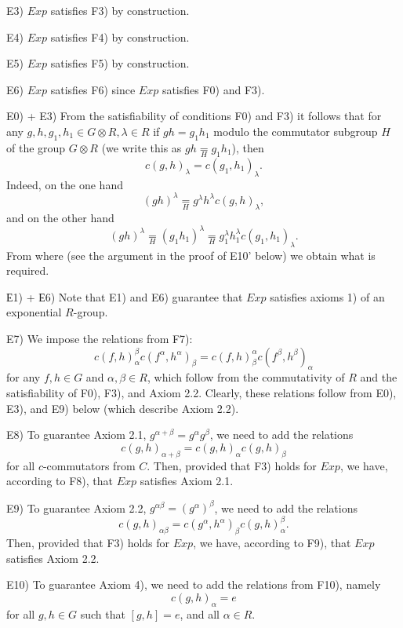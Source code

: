 \documentclass[11pt]{article}
\theoremstyle{definition}
\begin{document}
\medskip
\noindent
E3) $Exp$ satisfies F3) by construction.


\medskip
\noindent
E4) $Exp$ satisfies F4) by construction.


\medskip
\noindent
E5) $Exp$ satisfies F5) by construction.

\medskip
\noindent
E6) $Exp$ satisfies F6) since $Exp$ satisfies F0) and F3).

\medskip
\noindent
E0) + E3)  From the satisfiability of conditions F0) and F3) it follows that for any $g, h, g_1, h_1 \in G\otimes R, \lambda \in R$ if $gh = g_1h_1$ modulo the commutator subgroup $H$ of the group $G\otimes R$ (we write this as $gh \underset{H}{=} g_1h_1$), then
$$
c(g,h)_\lambda =c(g_1,h_1)_\lambda.
$$
Indeed, on the one hand
$$
(gh)^\lambda \underset{H}{=} g^\lambda h^\lambda c(g,h)_\lambda,
$$
and on the other hand
$$
(gh)^\lambda \underset{H}{=} (g_1h_1)^\lambda \underset{H}{=} g_1^\lambda h_1^\lambda c(g_1,h_1)_\lambda.
$$
From where (see the argument in the proof of E10' below) we obtain what is required.  

\medskip
\noindent
Е1) + Е6) Note that E1) and E6) guarantee that $Exp$ satisfies axioms 1) of an exponential $R$-group.


\medskip
\noindent
E7) We impose the relations from F7): 
$$
c(f,h)_{\alpha}^{\beta}c(f^{\alpha},h^{\alpha})_{\beta}
    =c(f,h)_{\beta}^{\alpha}c(f^{\beta},h^{\beta})_{\alpha}
$$
for any $f,h \in G$ and $\alpha,\beta\in R$, which follow from the commutativity of $R$ and the satisfiability of F0), F3), and Axiom 2.2. Clearly, these relations follow from E0), E3), and E9) below (which describe Axiom 2.2). 

\medskip
\noindent
E8) To guarantee Axiom 2.1, $g^{\alpha+\beta} = g^{\alpha}g^{\beta}$, we need to add the relations
$$
 c(g,h)_{\alpha +\beta} = c(g,h)_{\alpha}c(g,h)_{\beta}
$$
for all $c$-commutators from $C$. Then, provided that F3) holds for $Exp$, we have, according to F8), that $Exp$ satisfies Axiom 2.1.

\medskip
\noindent
E9) To guarantee Axiom 2.2, $g^{\alpha \beta} = (g^{\alpha})^{\beta}$, we need to add the relations 
 $$
 c(g,h)_{\alpha\beta} = c(g^{\alpha},h^{\alpha})_\beta  c(g,h)_{\alpha}^{\beta}.
$$
Then, provided that F3) holds for $Exp$, we have, according to F9), that $Exp$ satisfies Axiom 2.2.


\medskip
\noindent
E10) To guarantee Axiom 4), we need to add the relations from F10), namely 
$$
c(g,h)_\alpha = e
$$
for all $g, h \in G$ such that $[g,h] = e$, and all $\alpha \in R$.
\end{document}
